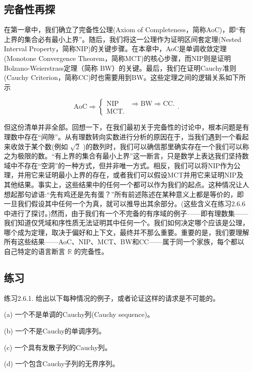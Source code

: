 \subsection{完备性再探}

在第一章中，我们确立了完备性公理(Axiom of Completeness，简称AoC)，即“有上界的集合必有最小上界”。随后，我们将这一公理作为证明区间套定理(Nested Interval Property，简称NIP)的关键步骤。在本章中，AoC是单调收敛定理(Monotone Convergence Theorem，简称MCT)的核心步骤，而NIP则是证明Bolzano-Weierstrass定理（简称 BW）的关键。最后，我们在证明Cauchy准则(Cauchy Criterion，简称CC)时也需要用到BW。这些定理之间的逻辑关系如下所示

\[
\mathrm{{AoC}} \Rightarrow  \left\{  {\begin{array}{ll} \mathrm{{NIP}} &  \Rightarrow  \mathrm{{BW}} \Rightarrow  \mathrm{{CC}}. \\  \mathrm{{MCT}}. &  \end{array}.}\right.
\]

但这份清单并非全部。回想一下，在我们最初关于完备性的讨论中，根本问题是有理数中存在“间隙”。从有理数转向实数进行分析的原因在于，当我们遇到一个看起来收敛于某个数(例如 \(\sqrt{2}\) )的数列时，我们可以确信那里确实存在一个我们可以称之为极限的数。“有上界的集合有最小上界”这一断言，只是数学上表达我们坚持数域中不存在“空洞”的一种方式，但并非唯一方式。相反，我们可以将NIP作为公理，并用它来证明最小上界的存在，或者我们可以假设MCT并用它来证明NIP及其他结果。事实上，这些结果中的任何一个都可以作为我们的起点。这种情况让人想起那句谚语:“先有鸡还是先有蛋？”所有前述陈述在某种意义上都是等价的，即一旦我们假设其中任何一个为真，就可以推导出其余部分。(这些含义在练习2.6.6中进行了探讨。)然而，由于我们有一个不完备的有序域的例子——即有理数集——我们知道仅凭域和序性质无法证明其中任何一个。我们如何决定哪个应该是公理，哪个成为定理，取决于偏好和上下文，最终并不那么重要。重要的是，我们要理解所有这些结果——AoC、NIP、MCT、BW和CC——属于同一个家族，每个都以自己特定的语言断言 \(\mathbb{R}\) 的完备性。

\subsection{练习}

练习2.6.1. 给出以下每种情况的例子，或者论证这样的请求是不可能的。

(a) 一个不是单调的Cauchy列(Cauchy sequence)。

(b) 一个不是Cauchy的单调序列。

(c) 一个具有发散子列的Cauchy列。

(d) 一个包含Cauchy子列的无界序列。

